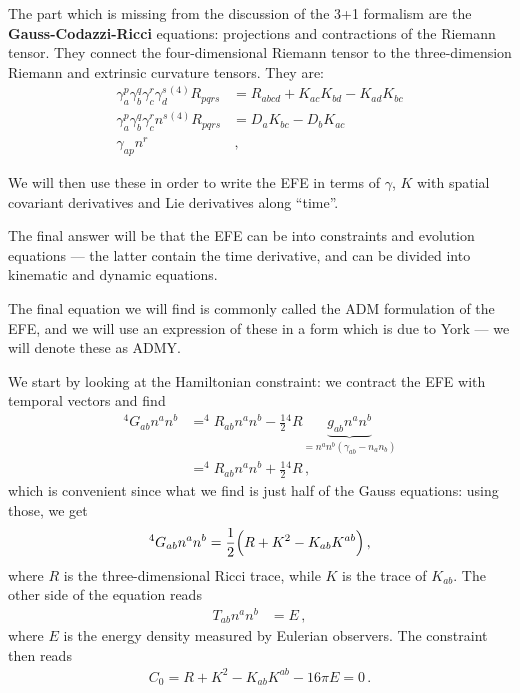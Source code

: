 \documentclass[main.tex]{subfiles}
\begin{document}

The part which is missing from the discussion of the 3+1 formalism are the \textbf{Gauss-Codazzi-Ricci} equations: projections and contractions of the Riemann tensor. 
They connect the four-dimensional Riemann tensor to the three-dimension Riemann and extrinsic curvature tensors. 
They are: 
%
\begin{align}
\gamma^{p}_{a}
\gamma^{q}_{b}
\gamma^{r}_{c}
\gamma^{s}_{d} {}^{(4)}R_{pqrs} 
&= R_{abcd} + K_{ac} K_{bd} - K_{ad} K_{bc}  \\
\gamma^{p}_{a}
\gamma^{q}_{b}
\gamma^{r}_{c}
n^s {}^{(4)}R_{pqrs} 
&= D_a K_{bc} - D_b K_{ac}  \\
\gamma_{ap} n^r &
\,,
\end{align}
%

We will then use these in order to write the EFE in terms of \(\gamma \), \(K\) with spatial covariant derivatives and Lie derivatives along ``time''. 

The final answer will be that the EFE can be into constraints and evolution equations --- the latter contain the time derivative, and can be divided into kinematic and dynamic equations. 

The final equation we will find is commonly called the ADM formulation of the EFE, and we will use an expression of these in a form which is due to York --- we will denote these as ADMY. 

We start by looking at the Hamiltonian constraint: we contract the EFE with temporal vectors and find
%
\begin{align}
^4 G_{ab} n^a n^b &= ^4 R_{ab} n^a n^b - \frac{1}{2} {}^4 R \underbrace{g_{ab} n^a n^b}_{= n^a n^b (\gamma_{ab} - n_a n_b)}  \\
&= ^4 R_{ab} n^a n^b + \frac{1}{2} {}^4 R
\,,
\end{align}
%
which is convenient since what we find is just half of the Gauss equations: using those, we get 
%
\begin{align}
^4 G_{ab} n^a n^b = \frac{1}{2} \qty(R + K^2 - K_{ab} K^{ab})
\,,
\end{align}
%
where \(R\) is the three-dimensional Ricci trace, while \(K\) is the trace of \(K_{ab}\). 
The other side of the equation reads 
%
\begin{align}
T_{ab} n^a n^b &= E 
\,,
\end{align}
%
where \(E\) is the energy density measured by Eulerian observers. 
The constraint then reads 
%
\begin{align}
C_0 = R + K^2 - K_{ab} K^{ab} - 16 \pi E = 0
\,.
\end{align}
\end{document}
